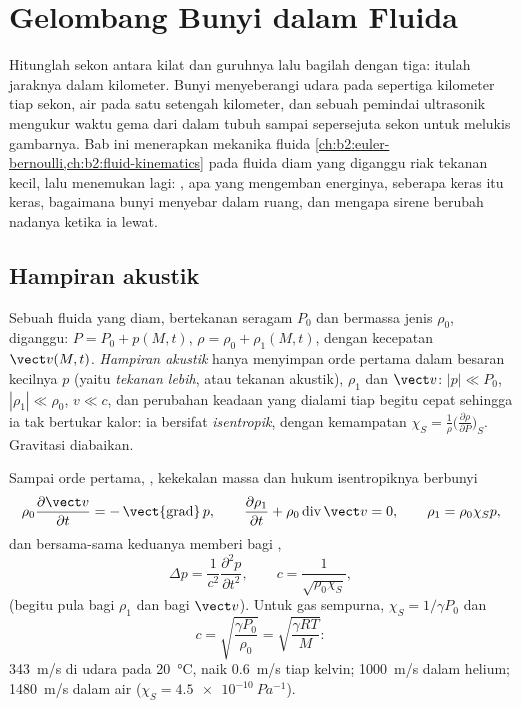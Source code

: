 \chapter{Gelombang Bunyi dalam Fluida}\label{ch:b2:sound-waves}

Hitunglah sekon antara kilat dan guruhnya lalu bagilah dengan tiga:
itulah jaraknya dalam kilometer. Bunyi menyeberangi udara pada
sepertiga kilometer tiap sekon, air pada satu setengah kilometer, dan
sebuah pemindai ultrasonik mengukur waktu gema dari dalam tubuh sampai
sepersejuta sekon untuk melukis gambarnya. Bab ini menerapkan
mekanika fluida \cref{ch:b2:euler-bernoulli,ch:b2:fluid-kinematics}
pada fluida diam yang diganggu riak tekanan kecil, lalu menemukan
 lagi: , apa yang mengemban
energinya, seberapa keras itu keras, bagaimana bunyi menyebar dalam ruang, dan mengapa sirene
berubah nadanya ketika ia lewat.

\section{Hampiran akustik}

\begin{definition}\label{def:b2:sound-waves:approximation}
Sebuah fluida yang diam, bertekanan seragam $P_0$ dan bermassa jenis $\rho_0$,
diganggu: $P = P_0 + p(M, t)$, $\rho = \rho_0 + \rho_1(M, t)$, dengan kecepatan
$\vect v(M, t)$. \emph{Hampiran akustik} hanya menyimpan orde
pertama dalam besaran kecilnya $p$ (yaitu \emph{tekanan lebih}, atau tekanan
akustik), $\rho_1$ dan $\vect v$: $|p| \ll P_0$, $|\rho_1| \ll \rho_0$, $v \ll c$,
dan perubahan keadaan yang dialami tiap  begitu cepat
sehingga ia tak bertukar kalor: ia bersifat \emph{isentropik}, dengan
kemampatan $\chi_S = \frac1\rho\bigl(\frac{\partial\rho}{\partial P}\bigr)_S$.
Gravitasi diabaikan.
\end{definition}

\begin{theorem}\label{thm:b2:sound-waves:equation}
Sampai orde pertama, , kekekalan massa dan hukum
isentropiknya berbunyi
\[
\rho_0\frac{\partial\vect v}{\partial t} = -\operatorname{\vect{grad}}p , \qquad
\frac{\partial\rho_1}{\partial t} + \rho_0\operatorname{div}\vect v = 0 , \qquad
\rho_1 = \rho_0\chi_Sp ,
\]
dan bersama-sama keduanya memberi  bagi ,
\[
\Delta p = \frac1{c^2}\frac{\partial^2p}{\partial t^2} , \qquad
c = \frac1{\sqrt{\rho_0\chi_S}} ,
\]
(begitu pula bagi $\rho_1$ dan bagi $\vect v$). Untuk gas sempurna, $\chi_S =
1/\gamma P_0$ dan
\[
c = \sqrt{\frac{\gamma P_0}{\rho_0}} = \sqrt{\frac{\gamma RT}{M}} :
\]
\qty{343}{m/s} di udara pada \qty{20}{\degreeCelsius}, naik \qty{0.6}{m/s}
tiap kelvin; \qty{1000}{m/s} dalam helium; \qty{1480}{m/s} dalam air ($\chi_S =
\qty{4.5e-10}{Pa^{-1}}$).
\end{theorem}

